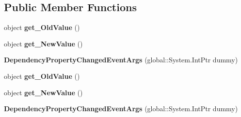 \subsection*{Public Member Functions}
\begin{DoxyCompactItemize}
\item 
\mbox{\label{class_windows_1_1_u_i_1_1_xaml_1_1_dependency_property_changed_event_args_ae4f18e2b5568671af10ff4232af56e6d}} 
object {\bfseries get\+\_\+\+Old\+Value} ()
\item 
\mbox{\label{class_windows_1_1_u_i_1_1_xaml_1_1_dependency_property_changed_event_args_a9f948d66a10d291f346697e57c1e5018}} 
object {\bfseries get\+\_\+\+New\+Value} ()
\item 
\mbox{\label{class_windows_1_1_u_i_1_1_xaml_1_1_dependency_property_changed_event_args_a74131a04ab6e85f2f133ed31ce9fb6b0}} 
{\bfseries Dependency\+Property\+Changed\+Event\+Args} (global\+::\+System.\+Int\+Ptr dummy)
\item 
\mbox{\label{class_windows_1_1_u_i_1_1_xaml_1_1_dependency_property_changed_event_args_ae4f18e2b5568671af10ff4232af56e6d}} 
object {\bfseries get\+\_\+\+Old\+Value} ()
\item 
\mbox{\label{class_windows_1_1_u_i_1_1_xaml_1_1_dependency_property_changed_event_args_a9f948d66a10d291f346697e57c1e5018}} 
object {\bfseries get\+\_\+\+New\+Value} ()
\item 
\mbox{\label{class_windows_1_1_u_i_1_1_xaml_1_1_dependency_property_changed_event_args_a74131a04ab6e85f2f133ed31ce9fb6b0}} 
{\bfseries Dependency\+Property\+Changed\+Event\+Args} (global\+::\+System.\+Int\+Ptr dummy)
\item 
\mbox{\label{class_windows_1_1_u_i_1_1_xaml_1_1_dependency_property_changed_event_args_ae4f18e2b5568671af10ff4232af56e6d}} 

\end{DoxyCompactItemize}
